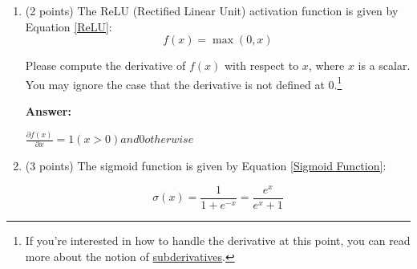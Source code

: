 \documentclass{article}
\newenvironment{answer}{
    {\bf Answer:} \sf \begingroup\color{red}
}{\endgroup}%
\begin{document}
\begin{enumerate}[label=(\alph*)]
\begin{shaded}
\begin{answer}
$
\frac{\partial \bm J_{\text{naive-softmax}}(\bm v_c, o, \bm U)}{\partial \bm U} &=
    \begin{bmatrix}
        \frac{\partial \bm J(\bm v_c, o, \bm U)}{\partial \bm u_1} & 
        \frac{\partial \bm J(\bm v_c, o, \bm U)}{\partial \bm u_2} & 
        \cdots & \frac{\partial \bm J(\bm v_c, o, \bm U)}{\partial \bm u_o} & \cdots &
        \frac{\partial \bm J(\bm v_c, o, \bm U)}{\partial \bm u_{|\text{Vocab}|}}
    \end{bmatrix} \\
    &= \begin{bmatrix}
        \hat{y}_1 \bm v_c & 
        \hat{y}_2 \bm v_c & 
        \cdots & \hat{y}_o \bm v_c - \bm v_c & \cdots &
        \hat{y}_{|\text{Vocab}|} \bm v_c
    \end{bmatrix} \\
    &= \bm v_c \hat{\bm y}^{\top} - \bm v_c \bm y^{\top} \\
    &= \bm v_c (\hat{\bm y} - \bm y)^{\top}
    $
\end{answer}
\end{shaded}

\item (2 points) The ReLU (Rectified Linear Unit) activation function is given by Equation \ref{ReLU}:
\begin{equation}
    \label{ReLU}
    f(x) = \max(0, x)
\end{equation}

Please compute the derivative of $f(x)$ with respect to $x$, where $x$ is a scalar. You may ignore the case that the derivative is not defined at 0.\footnote{If you're interested in how to handle the derivative at this point, you can read more about the notion of \hyperref[https://en.wikipedia.org/wiki/Subderivative]{subderivatives}.}

\begin{shaded}
\begin{answer}
$\frac{\partial f(x)}{\partial x} = 1 (x > 0) and 0 otherwise$
\end{answer}
\end{shaded}

\item (3 points) The sigmoid function is given by Equation \ref{Sigmoid Function}:

\begin{equation}
    \label{Sigmoid Function}
    \sigma (x) = \frac{1}{1 + e^{-x}} = \frac{e^{x}}{e^{x} + 1}
\end{equation}


\end{enumerate}
\end{document}
